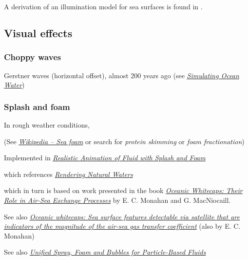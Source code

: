 A derivation of an illumination model for sea surfaces is found in .

\subsection{Visual effects}

\subsubsection{Choppy waves}



Gerstner waves (horizontal offset), almost 200 years ago (see \textit{\href{http://graphics.ucsd.edu/courses/rendering/2005/jdewall/tessendorf.pdf}{Simulating Ocean Water}})

\subsubsection{Splash and foam}

In rough weather conditions, 

(See \textit{\href{http://en.wikipedia.org/wiki/Sea_foam}{Wikipedia -- Sea foam}} or search for \textit{protein skimming} or \textit{foam fractionation})

Implemented in \textit{\href{http://nguyendangbinh.org/Proceedings/Eurographics/2003/cgf/volume22/issue3/paper127/paper127.pdf}{Realistic Animation of Fluid with Splash and Foam}}

which references \textit{\href{http://citeseerx.ist.psu.edu/viewdoc/download?doi=10.1.1.4.6262&rep=rep1&type=pdf}{Rendering Natural Waters}}

which in turn is based on work presented in the book \textit{\href{http://books.google.se/books?id=xuwFz1bPTHgC}{Oceanic Whitecaps: Their Role in Air-Sea Exchange Processes}} by E. C. Monahan and G. MacNiocaill.

See also \textit{\href{http://www.ias.ac.in/jess/sep2002/Ps18.pdf}{Oceanic whitecaps: Sea surface features detectable via satellite that are indicators of the magnitude of the air-sea gas transfer coefficient}} (also by  E. C. Monahan)

See also \textit{\href{http://cg.informatik.uni-freiburg.de/publications/2012_CGI_sprayFoamBubbles.pdf}{Unified Spray, Foam and Bubbles for Particle-Based Fluids}}




